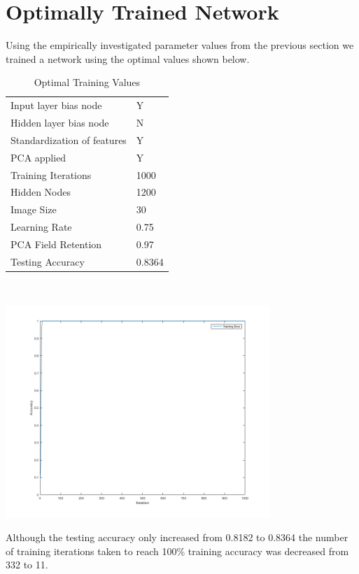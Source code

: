 \documentclass[12pt]{article}
\begin{document}
\newpage
\section{Optimally Trained Network}
Using the empirically investigated parameter values from the previous section we trained a network using the optimal values shown below.
\begin{center}
  \begin{table}[H]
    \begin{varwidth}[b]{0.4\linewidth}
      \centering
      \begin{tabular}{l|l}
        \hline
        Input layer bias node & Y \\
        Hidden layer bias node & N \\
        Standardization of features & Y \\
        PCA applied & Y \\
        \hline
        Training Iterations & 1000 \\
        Hidden Nodes & 1200 \\
        Image Size & 30 \\
        Learning Rate & 0.75 \\
        PCA Field Retention & 0.97 \\
        \hline
        Testing Accuracy & 0.8364 \\
        \hline
      \end{tabular}
      ~\\[40pt]
      \caption{Optimal Training Values}
      \label{table:optimal_table}
    \end{varwidth}%
    \hfill
    \begin{minipage}[b]{0.6\linewidth}
      \centering
      \includegraphics[width=100mm]{./accuracy_imgs/optimal_network.png}
      \label{fig:optimal_plot}
    \end{minipage}
  \end{table}
\end{center}
Although the testing accuracy only increased from 0.8182 to 0.8364 the number of training iterations taken to reach 100\% training accuracy was decreased from 332 to 11.
\end{document}
